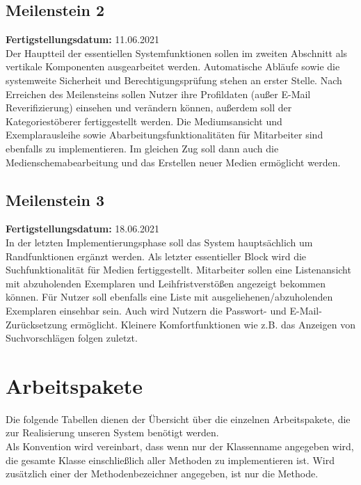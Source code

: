 \documentclass{article}
\begin{document}
\subsection{Meilenstein 2}
\textbf{Fertigstellungsdatum:} 11.06.2021 \\
Der Hauptteil der essentiellen Systemfunktionen sollen im zweiten Abschnitt als vertikale Komponenten ausgearbeitet werden. Automatische Abläufe sowie die systemweite Sicherheit und Berechtigungsprüfung stehen an erster Stelle. Nach Erreichen des Meilensteins sollen Nutzer ihre Profildaten (außer E-Mail Reverifizierung) einsehen und verändern können, außerdem soll der Kategoriestöberer fertiggestellt werden. Die Mediumsansicht und Exemplarausleihe sowie Abarbeitungsfunktionalitäten für Mitarbeiter sind ebenfalls zu implementieren. Im gleichen Zug soll dann auch die Medienschemabearbeitung und das Erstellen neuer Medien ermöglicht werden.
\subsection{Meilenstein 3}
\textbf{Fertigstellungsdatum:} 18.06.2021 \\
In der letzten Implementierungsphase soll das System hauptsächlich um Randfunktionen ergänzt werden. Als letzter essentieller Block wird die Suchfunktionalität für Medien fertiggestellt. Mitarbeiter sollen eine Listenansicht mit abzuholenden Exemplaren und Leihfristverstößen angezeigt bekommen können. Für Nutzer soll ebenfalls eine Liste mit ausgeliehenen/abzuholenden Exemplaren einsehbar sein. Auch wird Nutzern die Passwort- und E-Mail-Zurücksetzung ermöglicht. Kleinere Komfortfunktionen wie z.B. das Anzeigen von Suchvorschlägen folgen zuletzt.

\section{Arbeitspakete}

Die folgende Tabellen dienen der Übersicht über die einzelnen Arbeitspakete, die zur Realisierung unseren System benötigt werden.\\
Als Konvention wird vereinbart, dass wenn nur der Klassenname angegeben wird, die gesamte Klasse
einschließlich aller Methoden zu implementieren ist. Wird zusätzlich einer der Methodenbezeichner angegeben, ist nur
die Methode.
\end{document}
